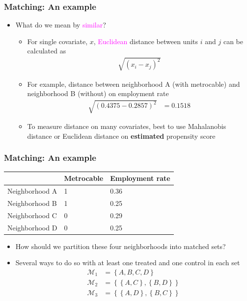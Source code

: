 \documentclass[table, xcolor = {dvipsnames}, 9pt]{beamer}
\theoremstyle{plain}
\begin{document}
\begin{frame}[t]
\frametitle{Matching: An example}
\vfill
\begin{itemize} \vfill
\item What do we mean by \textcolor{magenta}{similar}? \vfill
\begin{itemize} \vfill
\item For single covariate, $x$, \textcolor{magenta}{Euclidean} distance between units $i$ and $j$ can be calculated as \vfill
\begin{align*}
\sqrt{\left(x_i - x_j\right)^2}
\end{align*} \vfill
\item For example, distance between neighborhood A (with metrocable) and neighborhood B (without) on employment rate \vfill
\begin{align*}
\sqrt{\left(0.4375 - 0.2857\right)^2} & = 0.1518
\end{align*} \vfill
\item To measure distance on many covariates, best to use  Mahalanobis distance \citep{mahalanobis1936} or Euclidean distance on \textbf{estimated} propensity score \vfill
\end{itemize} \vfill
\end{itemize} \vfill
\end{frame}
\begin{frame}[t]
\frametitle{Matching: An example}
\vfill
\begin{table}[H]
\centering
\begin{tabular}{lll}
\hline
 & Metrocable & Employment rate \\ \hline
Neighborhood A  & 1  & 0.36 \\
Neighborhood B  & 1  & 0.25 \\
Neighborhood C  & 0  & 0.29 \\
Neighborhood D  & 0  & 0.25 \\
\hline
\end{tabular}
\end{table} \vfill
\begin{itemize} \vfill
\item How should we partition these four neighborhoods into matched sets? \vfill
\item Several ways to do so with at least one treated and one control in each set \vfill
\begin{align*}
\mathcal{M}_1 & = \left\{A, B, C, D\right\} \\
\mathcal{M}_2 & = \left\{\left\{A, C\right\}, \left\{B, D\right\}\right\} \\
\mathcal{M}_3 & = \left\{\left\{A, D\right\}, \left\{B, C\right\} \right\}
\end{align*}
\end{itemize} \vfill
\end{frame}
\end{document}
